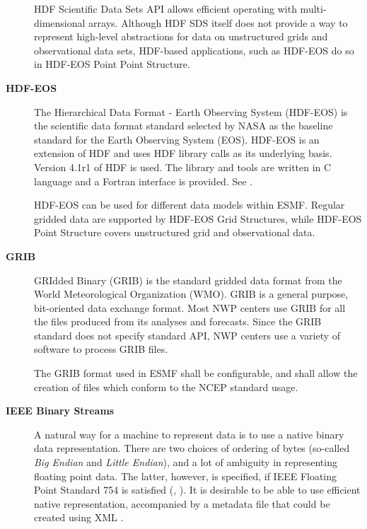 \begin{description}
HDF Scientific Data Sets API allows efficient operating with
multi-dimensional arrays. Although HDF SDS itself does not provide a way
to represent high-level abstractions for data on unstructured grids
and observational data sets, HDF-based applications, such as HDF-EOS
do so in HDF-EOS Point Point Structure.




\item[\bf HDF-EOS]  The Hierarchical Data Format - Earth Observing
System (HDF-EOS) is the scientific data format standard selected by
NASA as the baseline standard for the Earth Observing System (EOS). HDF-EOS
is an extension of HDF and uses HDF library calls as its underlying
basis. Version 4.1r1 of HDF is used. The library and tools are written
in C language and a Fortran interface is provided. See \cite{HDF-EOS}.

HDF-EOS can be used for different data models within ESMF. Regular
gridded data are supported by HDF-EOS Grid Structures, while HDF-EOS  
Point Structure covers unstructured grid and observational data.


\item[\bf GRIB] 
GRIdded Binary (GRIB) is the standard gridded data format from the
World Meteorological Organization (WMO).  GRIB is a general purpose,
bit-oriented data exchange format. Most NWP centers use GRIB for all the 
files produced from its analyses and forecasts. Since the GRIB standard does 
not specify standard API, NWP centers use a variety of software to process 
GRIB files.

The GRIB format used in ESMF shall be configurable, and shall allow the 
creation of files which conform to the NCEP standard usage.  

\item[\bf IEEE Binary Streams]
A natural way for a machine to represent data is to use a native binary data 
representation. There are  two choices of ordering of 
bytes (so-called {\it Big Endian} and {\it Little Endian}), and a lot of
ambiguity in representing floating point data. The latter, however, is
specified, if IEEE Floating Point Standard 754 is satisfied 
(\cite{IEEE-Floating-Point}, \cite{Kahan-IEEE-754}). It is
desirable to be able to use efficient native representation,
accompanied by a metadata file that could be created using XML \cite{XML-W3C}. 


\end{description}
